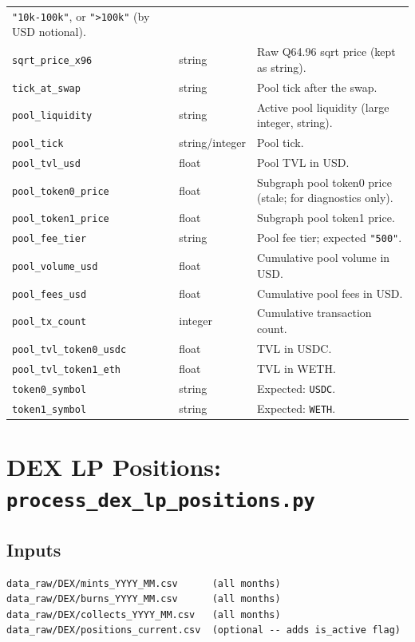 \documentclass[11pt,a4paper]{article}
\begin{document}
\begin{xltabular}{\linewidth}{L{4.5cm}L{3.0cm}Y}
  \texttt{"10k-100k"}, or \texttt{">100k"} (by USD notional). \\
\texttt{sqrt\_price\_x96} & string & Raw Q64.96 sqrt price (kept as string). \\
\texttt{tick\_at\_swap} & string & Pool tick after the swap. \\
\texttt{pool\_liquidity} & string & Active pool liquidity (large integer,
  string). \\
\texttt{pool\_tick} & string/integer & Pool tick. \\
\texttt{pool\_tvl\_usd} & float & Pool TVL in USD. \\
\texttt{pool\_token0\_price} & float & Subgraph pool token0 price
  (stale; for diagnostics only). \\
\texttt{pool\_token1\_price} & float & Subgraph pool token1 price. \\
\texttt{pool\_fee\_tier} & string & Pool fee tier; expected \texttt{"500"}. \\
\texttt{pool\_volume\_usd} & float & Cumulative pool volume in USD. \\
\texttt{pool\_fees\_usd} & float & Cumulative pool fees in USD. \\
\texttt{pool\_tx\_count} & integer & Cumulative transaction count. \\
\texttt{pool\_tvl\_token0\_usdc} & float & TVL in USDC. \\
\texttt{pool\_tvl\_token1\_eth} & float & TVL in WETH. \\
\texttt{token0\_symbol} & string & Expected: \texttt{USDC}. \\
\texttt{token1\_symbol} & string & Expected: \texttt{WETH}. \\
\bottomrule
\end{xltabular}

\section{DEX LP Positions: \texttt{process\_dex\_lp\_positions.py}}
\label{sec:dexlp}

\subsection{Inputs}

\begin{lstlisting}
data_raw/DEX/mints_YYYY_MM.csv      (all months)
data_raw/DEX/burns_YYYY_MM.csv      (all months)
data_raw/DEX/collects_YYYY_MM.csv   (all months)
data_raw/DEX/positions_current.csv  (optional -- adds is_active flag)
\end{lstlisting}
\end{document}
